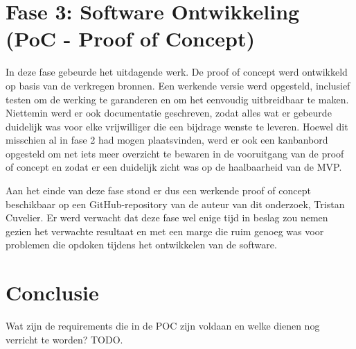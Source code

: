 \section{Fase 3: Software Ontwikkeling (PoC - Proof of Concept)}
In deze fase gebeurde het uitdagende werk. De proof of concept werd ontwikkeld op basis van de verkregen bronnen. Een werkende versie werd opgesteld, inclusief testen om de werking te garanderen en om het eenvoudig uitbreidbaar te maken. Niettemin werd er ook documentatie geschreven, zodat alles wat er gebeurde duidelijk was voor elke vrijwilliger die een bijdrage wenste te leveren. Hoewel dit misschien al in fase 2 had mogen plaatsvinden, werd er ook een kanbanbord opgesteld om net iets meer overzicht te bewaren in de vooruitgang van de proof of concept en zodat er een duidelijk zicht was op de haalbaarheid van de MVP.

Aan het einde van deze fase stond er dus een werkende proof of concept beschikbaar op een GitHub-repository van de auteur van dit onderzoek, Tristan Cuvelier. 
Er werd verwacht dat deze fase wel enige tijd in beslag zou nemen gezien het verwachte resultaat en met een marge die ruim genoeg was voor problemen die opdoken tijdens het ontwikkelen van de software.

\section{Conclusie}
Wat zijn de requirements die in de POC zijn voldaan en welke dienen nog verricht te worden? TODO.